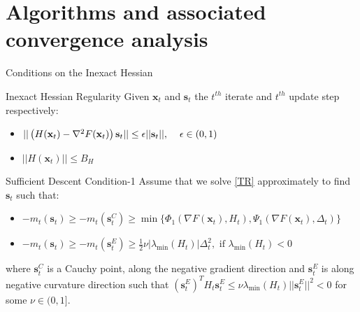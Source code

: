 \documentclass[10pt]{beamer}
\newcommand{\h}{\nabla^{2}}
\newcommand{\g}{\nabla}
\newcommand{\xbold}{\mathbf{x}}
\newcommand{\sbold}{\mathbf{s}}
\newcommand{\mineig}{\lambda_{\min}}
\begin{document}
\section{Algorithms and associated convergence analysis}
\begin{frame}{Conditions on the Inexact Hessian}
\begin{alertblock}{Inexact Hessian Regularity}
Given \(\xbold_{t}\) and \(\sbold_{t}\) the \(t^{th}\) iterate and \(t^{th}\) update step respectively:
\begin{itemize}
\item \(||\left(H(\xbold_{t}) - \h F(\xbold_{t})\right)\sbold_{t}|| \leq \epsilon||\sbold_{t}||, \hspace{4mm} \epsilon \in (0,1)\)
\item \(||H(\xbold_{t}) || \leq B_{H}\)
\end{itemize}
\end{alertblock}
\pause
\begin{alertblock}{Sufficient Descent Condition-1}
Assume that we solve \ref{TR} approximately to find \(\sbold_{t}\) such that:
\begin{itemize}
\item \(-m_{t}(\sbold_{t}) \geq -m_{t}(\sbold_{t}^{C}) \geq \min\lbrace\Phi_{1}(\g F(\xbold_{t}), H_{t}), \Psi_{1}(\g F(\xbold_{t}), \Delta_{t})\rbrace \)
\item \(-m_{t}(\sbold_{t}) \geq -m_{t}(\sbold_{t}^{E}) \geq \frac{1}{2}\nu|\mineig(H_{t})|\Delta_{t}^{2}, \text{ if } \mineig(H_{t}) < 0 \)
\end{itemize}
where \(\sbold_{t}^{C}\) is a Cauchy point, along the negative gradient direction and \(\sbold_{t}^{E}\) is along negative curvature direction such that \((\sbold_{t}^{E})^{T} H_{t} \sbold_{t}^{E} \leq \nu\mineig(H_{t})||\sbold_{t}^{E}||^{2} < 0\) for some \(\nu \in (0, 1]\).
\end{alertblock}
\end{frame}
\end{document}
